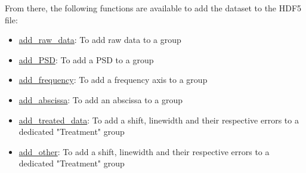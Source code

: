 From there, the following functions are available to add the dataset to the HDF5 file:
\begin{itemize}
    \item \hyperref[subchapter:wrapper.add_raw_data]{add\_raw\_data}: To add raw data to a group
    \item \hyperref[subchapter:wrapper.add_psd]{add\_PSD}: To add a PSD to a group
    \item \hyperref[subchapter:wrapper.add_frequency]{add\_frequency}: To add a frequency axis to a group
    \item \hyperref[subchapter:wrapper.add_abscissa]{add\_abscissa}: To add an abscissa to a group
    \item \hyperref[subchapter:wrapper.add_treated_data]{add\_treated\_data}: To add a shift, linewidth and their respective errors to a dedicated "Treatment" group
    \item \hyperref[subchapter:wrapper.add_other]{add\_other}: To add a shift, linewidth and their respective errors to a dedicated "Treatment" group
\end{itemize}